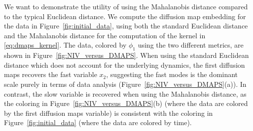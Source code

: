We want to demonstrate the utility of using the Mahalanobis distance compared to the typical Euclidean distance.
%
We compute the diffusion map embedding for the data in Figure~\ref{fig:initial_data},
using both the standard Euclidean distance and the Mahalanobis distance for the computation of the kernel in \eqref{eq:dmaps_kernel}.
%
The data, colored by $\phi_1$ using the two different metrics, are shown in Figure~\ref{fig:NIV_versus_DMAPS}.
%
When using the standard Euclidean distance which does not account for the underlying dynamics, the first diffusion maps recovers the fast variable $x_2$, suggesting the fast modes is the dominant scale purely in terms of data analysis (Figure~\ref{fig:NIV_versus_DMAPS}(a)).
%
In contrast, the slow variable is recovered when using the Mahalanobis distance, as the coloring in Figure~\ref{fig:NIV_versus_DMAPS}(b) (where the data are colored by the first diffusion maps variable) is consistent with the coloring in Figure~\ref{fig:initial_data} (where the data are colored by time).

